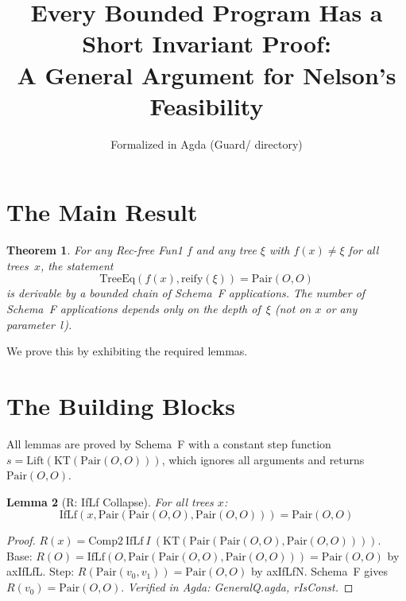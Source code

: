 \documentclass[11pt]{article}
\title{Every Bounded Program Has a Short Invariant Proof:\\A General Argument for Nelson's Feasibility}
\author{Formalized in Agda (Guard/ directory)}
\date{}
\newtheorem{theorem}{Theorem}
\newtheorem{lemma}[theorem]{Lemma}
\begin{document}
\maketitle

\section{The Main Result}

\begin{theorem}\label{thm:main}
For any Rec-free Fun1 $f$ and any tree $\xi$ with $f(x) \neq \xi$ for all trees~$x$,
the statement
\[
  \mathrm{TreeEq}(f(x), \mathrm{reify}(\xi)) = \mathrm{Pair}(O,O)
\]
is derivable by a bounded chain of Schema~F applications. The number of Schema~F
applications depends only on the depth of~$\xi$ (not on $x$ or any parameter~$l$).
\end{theorem}

We prove this by exhibiting the required lemmas.

\section{The Building Blocks}

All lemmas are proved by Schema~F with a constant step function
$s = \mathrm{Lift}(\mathrm{KT}(\mathrm{Pair}(O,O)))$, which ignores all arguments and
returns $\mathrm{Pair}(O,O)$.

\begin{lemma}[R: IfLf Collapse]\label{lem:R}
For all trees $x$:
\[
  \mathrm{IfLf}(x, \mathrm{Pair}(\mathrm{Pair}(O,O), \mathrm{Pair}(O,O))) = \mathrm{Pair}(O,O)
\]
\end{lemma}
\begin{proof}
$R(x) = \mathrm{Comp2}\ \mathrm{IfLf}\ I\ (\mathrm{KT}(\mathrm{Pair}(\mathrm{Pair}(O,O), \mathrm{Pair}(O,O))))$.
Base: $R(O) = \mathrm{IfLf}(O, \mathrm{Pair}(\mathrm{Pair}(O,O), \mathrm{Pair}(O,O))) = \mathrm{Pair}(O,O)$ by axIfLfL.
Step: $R(\mathrm{Pair}(v_0, v_1)) = \mathrm{Pair}(O,O)$ by axIfLfN. Schema~F gives $R(v_0) = \mathrm{Pair}(O,O)$.
\emph{Verified in Agda: GeneralQ.agda, rIsConst.}
\end{proof}
\end{document}
